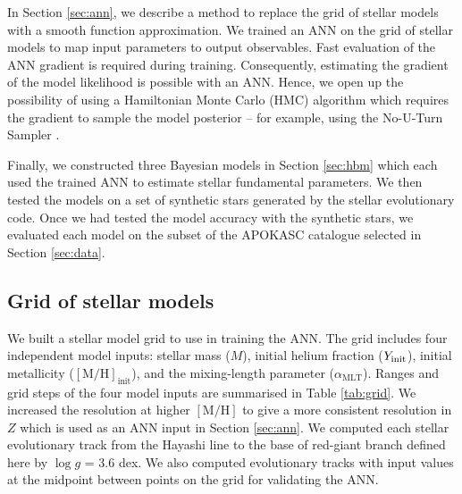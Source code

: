 \documentclass[a4paper,fleqn,usenatbib]{mnras}
\newcommand{\metallicity}{\ensuremath{[\mathrm{M}/\mathrm{H}]}}
\newcommand{\mlt}{\ensuremath{{\alpha_\mathrm{MLT}}}}
\begin{document}
In Section \ref{sec:ann}, we describe a method to replace the grid of stellar models with a smooth function approximation. We trained an ANN on the grid of stellar models to map input parameters to output observables. Fast evaluation of the ANN gradient is required during training. Consequently, estimating the gradient of the model likelihood is possible with an ANN. Hence, we open up the possibility of using a Hamiltonian Monte Carlo (HMC) algorithm which requires the gradient to sample the model posterior -- for example, using the No-U-Turn Sampler \citep[NUTS;][]{Hoffman.Gelman2014}.

Finally, we constructed three Bayesian models in Section \ref{sec:hbm} which each used the trained ANN to estimate stellar fundamental parameters. We then tested the models on a set of synthetic stars generated by the stellar evolutionary code. Once we had tested the model accuracy with the synthetic stars, we evaluated each model on the subset of the APOKASC catalogue selected in Section \ref{sec:data}.

\subsection{Grid of stellar models}\label{sec:grid}

We built a stellar model grid to use in training the ANN. The grid includes four independent model inputs: stellar mass ($M$), initial helium fraction ($Y_{\rm init}$), initial metallicity ($\mathrm{[M/H]}_\mathrm{init}$), and the mixing-length parameter ($\mlt$).  Ranges and grid steps of the four model inputs are summarised in Table \ref{tab:grid}. We increased the resolution at higher $\metallicity$ to give a more consistent resolution in $Z$ which is used as an ANN input in Section \ref{sec:ann}. We computed each stellar evolutionary track from the Hayashi line to the base of red-giant branch defined here by $\log g$ = 3.6 dex. We also computed evolutionary tracks with input values at the midpoint between points on the grid for validating the ANN.
\end{document}
